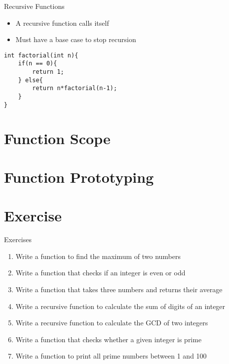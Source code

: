\documentclass[12pt, aspectratio=169]{beamer}
\begin{document}




    \begin{frame}[fragile]{Recursive Functions}
        \begin{itemize}
            \item A recursive function calls itself
            \item Must have a base case to stop recursion
        \end{itemize}

        \begin{verbatim}
int factorial(int n){
    if(n == 0){
        return 1;
    } else{
        return n*factorial(n-1);
    }
}
        \end{verbatim}
    \end{frame}


    \section{Function Scope}


    \section{Function Prototyping}


    \section{Exercise}

    \begin{frame}{Exercises}
        \begin{enumerate}
            \item Write a function to find the maximum of two numbers
            \item Write a function that checks if an integer is even or odd
            \item Write a function that takes three numbers and returns their average
            \item Write a recursive function to calculate the sum of digits of an integer
            \item Write a recursive function to calculate the GCD of two integers
            \item Write a function that checks whether a given integer is prime
            \item Write a function to print all prime numbers between 1 and 100
        \end{enumerate}
    \end{frame}
\end{document}
